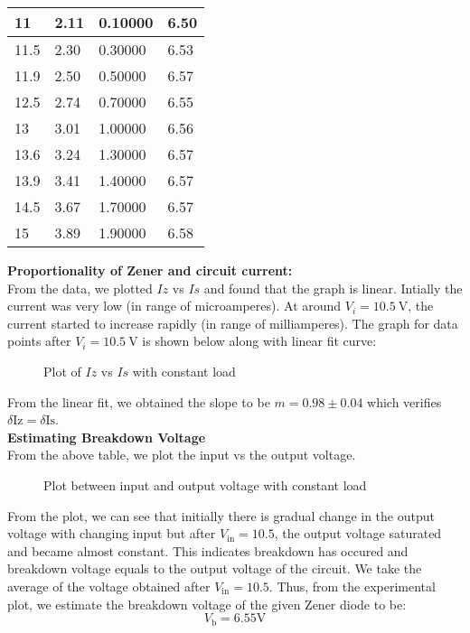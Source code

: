 \documentclass{scrartcl}
\begin{document}
\begin{longtable}{|l|l|l|l|}
        11     & 2.11    & 0.10000       & 6.50    \\ \hline
        11.5   & 2.30    & 0.30000       & 6.53    \\ \hline
        11.9   & 2.50    & 0.50000       & 6.57    \\ \hline
        12.5   & 2.74    & 0.70000       & 6.55    \\ \hline
        13     & 3.01    & 1.00000       & 6.56    \\ \hline
        13.6   & 3.24    & 1.30000       & 6.57    \\ \hline
        13.9   & 3.41    & 1.40000       & 6.57    \\ \hline
        14.5   & 3.67    & 1.70000       & 6.57    \\ \hline
        15     & 3.89    & 1.90000       & 6.58    \\ \hline
        \end{longtable}
        
\noindent
\textbf{Proportionality of Zener and circuit current:}\\[0.3cm]
From the data, we plotted $Iz$ vs $Is$ and found that the graph is linear. Intially the current was very low (in range of microamperes). At around $V_i = 10.5 \ \mathrm{V}$, the current started to increase rapidly (in range of milliamperes). The graph for data points after $V_i = 10.5 \ \mathrm{V}$ is shown below along with linear fit curve:
\begin{figure}[H]
        \centering
        
        \caption{Plot of $Iz$ vs $Is$ with constant load}
\end{figure}
\noindent
From the linear fit, we obtained the slope to be $m = 0.98\pm0.04$ which verifies $\delta \mathrm{Iz} = \delta \mathrm{Is}$.\\[0.3cm]
\textbf{Estimating Breakdown Voltage}\\[0.3cm]
From the above table, we plot the input vs the output voltage. 
\begin{figure}[H]
        \centering
        
        \caption{Plot between input and output voltage with constant load}
\end{figure}
\noindent
From the plot, we can see that initially there is gradual change in the output voltage with changing input but after $V_{\mathrm{in}} = 10.5$, the output voltage saturated and became almost constant. This indicates breakdown has occured and breakdown voltage equals to the output voltage of the circuit.
We take the average of the voltage obtained after $V_{\mathrm{in}} = 10.5$. Thus, from the experimental plot, we estimate the breakdown voltage of the given Zener diode to be:
$$\boxed{V_\mathrm{b} = 6.55 \mathrm{V}}$$
\end{document}
